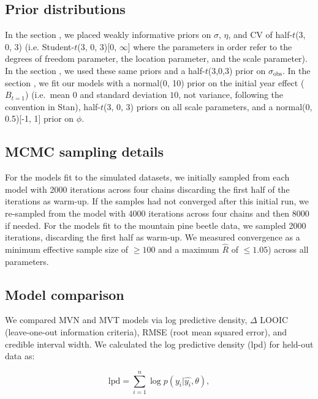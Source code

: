 \documentclass[12pt,english]{article}
\begin{document}
\begin{spacing}{1.4}
\subsection{Prior distributions}

In the section \emph{}, we placed weakly
informative priors on $\sigma$, $\eta$, and CV of half-$t$(3, 0, 3) (i.e.
Student-$t$(3, 0, 3)[0, $\infty$] where the parameters in order refer to the
degrees of freedom parameter, the location parameter, and the scale parameter).
In the section \emph{}, we used these same priors and a
half-$t$(3,0,3) prior on $\sigma_{\mathrm{obs}}$. In the section
\emph{}, we fit our models with a normal(0, 10)
prior on the initial year effect ($B_{t=1}$) (i.e.\ mean $0$ and standard
  deviation $10$, not variance, following the convention in Stan), half-$t$(3,
0, 3) priors on all scale parameters, and a normal(0, 0.5)[-1, 1] prior on
$\phi$.

\subsection{MCMC sampling details}

For the models fit to the simulated datasets, we initially sampled from each
model with 2000 iterations across four chains discarding the first half of the
iterations as warm-up. If the samples had not converged after this initial run,
we re-sampled from the model with 4000 iterations across four chains and then
8000 if needed. For the models fit to the mountain pine beetle data, we sampled
2000 iterations, discarding the first half as warm-up. We measured
convergence as a minimum effective sample size of $\ge 100$ and a maximum
$\hat{R}$ of $\le 1.05$) across all parameters.

\subsection{Model comparison}

We compared MVN and MVT models via log predictive density, $\Delta$ LOOIC
(leave-one-out information criteria), RMSE (root mean squared error), and
credible interval width. We calculated the log predictive density (lpd) for
held-out data as:

\begin{equation}
  \mathrm{lpd} = \sum^{n}_{i=1}{\log  p(y_{i} |
      \widehat{y_{i}}, \theta)},
\end{equation}


\end{spacing}
\end{document}
